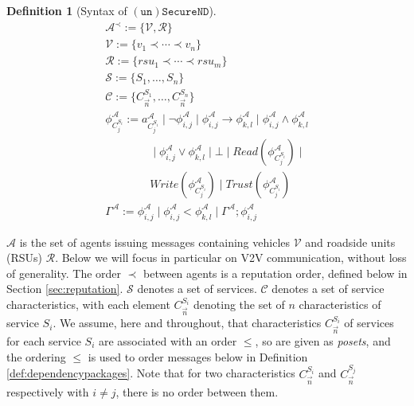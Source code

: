 \documentclass[compsoc, conference, letterpaper, 10pt, times]{IEEEtran}
\newtheorem{definition}{Definition}
\begin{document}
\begin{definition}[Syntax of $\mathtt{(un)SecureND}$]\label{def:syntax} %
	\begin{displaymath}
	\begin{array}{l}
	\mathcal{A}^{\prec}:= \{\mathcal{V, R}\}\\
	\mathcal{V}:= \{v_{1}\prec \cdots \prec v_{n}\}\\
	\mathcal{R}:= \{rsu_{1}\prec\cdots \prec rsu_{m}\}\\
	\mathcal{S}:= \{S_1, \dots, S_{n}\}\\  %
	\mathcal{C}:= \{C^{S_1}_{\overrightarrow{n}},  \dots, C^{S_{n}}_{\overrightarrow{n}}\}\\  %
	\phi^{\mathcal{A}}_{C^{S_{i}}_{j}}:= a^{\mathcal{A}}_{C^{S_{i}}_{j}}\mid \neg \phi^{\mathcal{A}}_{i,j}\mid \phi^{\mathcal{A}}_{i,j}\rightarrow \phi^{\mathcal{A}}_{k,l}\mid \phi^{\mathcal{A}}_{i,j}\wedge \phi^{\mathcal{A}}_{k,l}\\
	\qquad \qquad \mid \phi^{\mathcal{A}}_{i,j}\vee \phi^{\mathcal{A}}_{k,l} \mid \bot \mid Read(\phi^{\mathcal{A}}_{C^{S_{i}}_{j}})\mid\\ 
	\qquad \qquad Write(\phi^{\mathcal{A}}_{C^{S_{i}}_{j}})\mid Trust(\phi^{\mathcal{A}}_{C^{S_{i}}_{j}})\\
	\Gamma^{\mathcal{A}}:= 
	\phi^{\mathcal{A}}_{i,j} \mid \phi^{\mathcal{A}}_{i,j} < \phi^{\mathcal{A}}_{k,l} \mid \Gamma^{\mathcal{A}}; \phi^{\mathcal{A}}_{i,j}
	
	\end{array}
	\end{displaymath}
\end{definition}
%
%
$\mathcal{A}$ is the set of agents issuing messages containing vehicles $\mathcal{V}$ and roadside units (RSUs) $\mathcal{R}$. Below we will focus in particular on V2V communication, without loss of generality. The order $\prec$ between agents is a reputation order, defined below in Section \ref{sec:reputation}. $\mathcal{S}$ denotes a set of services. $\mathcal{C}$ denotes a set of service characteristics, with each element $C^{S_i}_{\overrightarrow{n}}$ denoting the set of $n$ characteristics of service $S_{i}$. We assume, here and throughout, that characteristics $C^{S_i}_{\overrightarrow{n}}$ of services for each service $S_i$ are associated with an order $\leq$, so are given as \emph{posets}, and the ordering $\leq$ is used to order messages below in Definition \ref{def:dependencypackages}. Note that for two characteristics $C^{S_i}_{\overrightarrow{n}}$ and $C^{S_j}_{\overrightarrow{n}}$ respectively with $i\neq j$, there is no order between  them.
\end{document}

